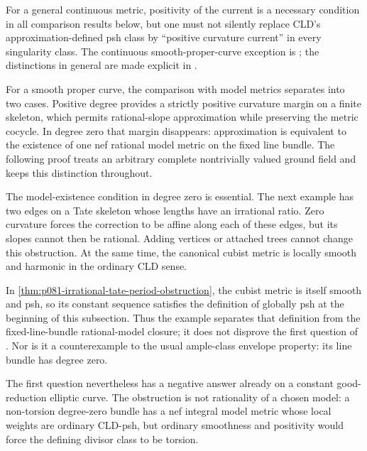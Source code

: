 For a general continuous metric, positivity of the current is a necessary
condition in all comparison results below, but one must not silently replace
CLD's approximation-defined psh class by ``positive curvature current'' in
every singularity class.  The continuous smooth-proper-curve exception is
; the distinctions in
general are made explicit in
.

For a smooth proper curve, the comparison with model metrics separates into
two cases.  Positive degree provides a strictly positive curvature margin
on a finite skeleton, which permits rational-slope approximation while
preserving the metric cocycle.  In degree zero that margin disappears:
approximation is equivalent to the existence of one nef rational model
metric on the fixed line bundle.  The following proof treats an arbitrary
complete nontrivially valued ground field and keeps this distinction
throughout.




The model-existence condition in degree zero is essential.  The next example
has two edges on a Tate skeleton whose lengths have an irrational ratio.
Zero curvature forces the correction to be affine along each of these
edges, but its slopes cannot then be rational.  Adding vertices or attached
trees cannot change this obstruction.  At the same time, the canonical
cubist metric is locally smooth and harmonic in the ordinary CLD sense.




In \cref{thm:p081-irrational-tate-period-obstruction}, the cubist metric is
itself smooth and psh, so its constant sequence satisfies the definition of
globally psh at the beginning of this subsection.  Thus the example
separates that definition from the fixed-line-bundle rational-model closure;
it does not disprove the first question of
\cite[Remark~17.8.10]{CLD25}.  Nor is it a counterexample to the usual
ample-class envelope property: its line bundle has degree zero.

The first question nevertheless has a negative answer already on a constant
good-reduction elliptic curve.  The obstruction is not rationality of a
chosen model: a non-torsion degree-zero bundle has a nef integral model
metric whose local weights are ordinary CLD-psh, but ordinary smoothness and
positivity would force the defining divisor class to be torsion.

